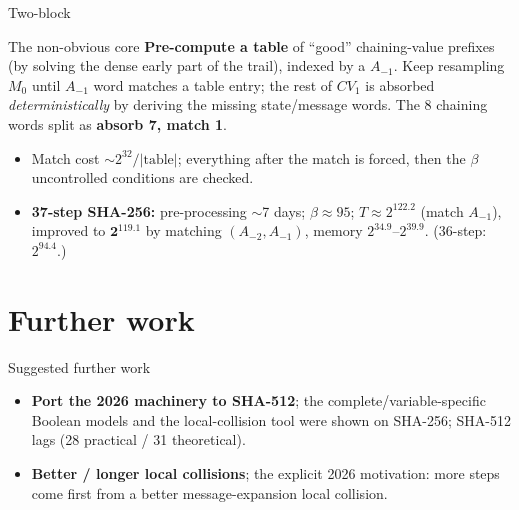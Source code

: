 \documentclass[aspectratio=169,9pt]{beamer}
\newcommand{\key}[1]{\textcolor{key}{\textbf{#1}}}
\begin{document}
\begin{frame}{Two-block}
\begin{block}{The non-obvious core}
\small \key{Pre-compute a table} of ``good'' chaining-value prefixes (by solving the dense early part of the trail), indexed by a $A_{-1}$. Keep resampling $M_0$ until $A_{-1}$ word matches a table entry; the rest of $CV_1$ is absorbed \emph{deterministically} by deriving the missing state/message words. The 8 chaining words split as \key{absorb 7, match 1}.
\end{block}
\begin{itemize}\small
  \item Match cost $\sim 2^{32}/|\text{table}|$; everything after the match is forced, then the $\beta$ uncontrolled conditions are checked.
  \item \textbf{37-step SHA-256:} pre-processing $\sim$7 days; $\beta\approx 95$; $T\approx 2^{122.2}$ (match $A_{-1}$), improved to \textcolor{key}{$\mathbf{2^{119.1}}$} by matching $(A_{-2},A_{-1})$, memory $2^{34.9}$--$2^{39.9}$. (36-step: $2^{94.4}$.)
\end{itemize}
\end{frame}

\section{Further work}

\begin{frame}{Suggested further work}
\begin{itemize}
  \item \key{Port the 2026 machinery to SHA-512}; the complete/variable-specific Boolean models and the local-collision tool were shown on SHA-256; SHA-512 lags (28 practical / 31 theoretical).
  \item \key{Better / longer local collisions}; the explicit 2026 motivation: more steps come first from a better message-expansion local collision.
\end{itemize}
\end{frame}
\end{document}
